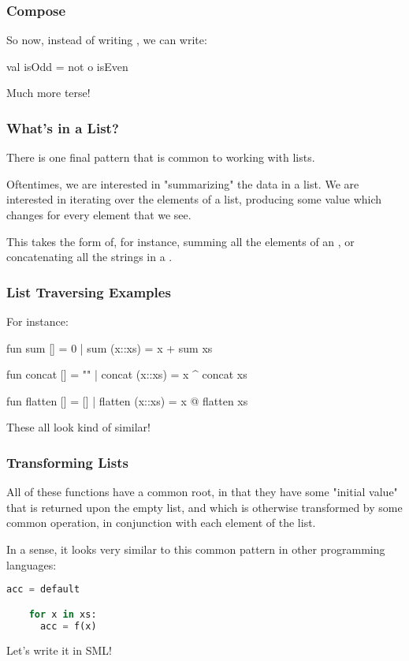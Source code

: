 \documentclass[aspectratio=169]{beamer}
\begin{document}
\begin{frame}[fragile]
  \frametitle{Compose}

  So now, instead of writing , we can write:

  \begin{codeblock}
    val isOdd = not o isEven
  \end{codeblock}

  Much more terse!
\end{frame}

\begin{frame}[fragile]
  \frametitle{What's in a List?}

  There is one final pattern that is common to working with lists.

  Oftentimes, we are interested in "summarizing" the data in a list. We are 
  interested in iterating over the elements of a list, producing some value which
  changes for every element that we see.

  This takes the form of, for instance, summing all the elements of an ,
  or concatenating all the strings in a .
\end{frame}

\begin{frame}[fragile]
  \frametitle{List Traversing Examples}

  For instance:

  \begin{codeblock}
    fun sum [] = 0
      | sum (x::xs) = x + sum xs

    fun concat [] = ""
      | concat (x::xs) = x ^ concat xs

    fun flatten [] = []
      | flatten (x::xs) = x @ flatten xs
  \end{codeblock}

  These all look kind of similar!
\end{frame}

\begin{frame}[fragile]
  \frametitle{Transforming Lists}

  All of these functions have a common root, in that they have some "initial value"
  that is returned upon the empty list, and which is otherwise transformed by some
  common operation, in conjunction with each element of the list.

  In a sense, it looks very similar to this common pattern in other programming
  languages:
  
  \begin{lstlisting}[language=Python]
    acc = default 

    for x in xs:
      acc = f(x)
  \end{lstlisting}

  Let's write it in SML!
\end{frame}
\end{document}
